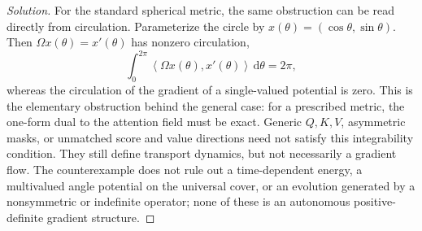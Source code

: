 \documentclass[11pt]{amsart}
\numberwithin{equation}{section}
\theoremstyle{plain}
\newcommand{\dd}{\,\mathrm{d}}
\newcommand{\ip}[2]{\left\langle#1,#2\right\rangle}
\begin{document}
\begin{proof}[Solution]
For the standard spherical metric, the same obstruction can be read directly
from circulation.  Parameterize the circle by
$x(\theta)=(\cos\theta,\sin\theta)$.  Then
$\Omega x(\theta)=x'(\theta)$ has nonzero circulation,
\[
 \int_0^{2\pi}\ip{\Omega x(\theta)}{x'(\theta)}\dd\theta=2\pi,
\]
whereas the circulation of the gradient of a single-valued potential is zero.
This is the elementary obstruction behind the general case: for a prescribed
metric, the one-form dual to the attention field must be exact.  Generic
$Q,K,V$, asymmetric masks, or unmatched score and value directions need not
satisfy this integrability condition.  They still define transport dynamics,
but not necessarily a gradient flow.  The counterexample does not rule out a
time-dependent energy, a multivalued angle potential on the universal cover,
or an evolution generated by a nonsymmetric or indefinite operator; none of
these is an autonomous positive-definite gradient structure.
\end{proof}
\end{document}
